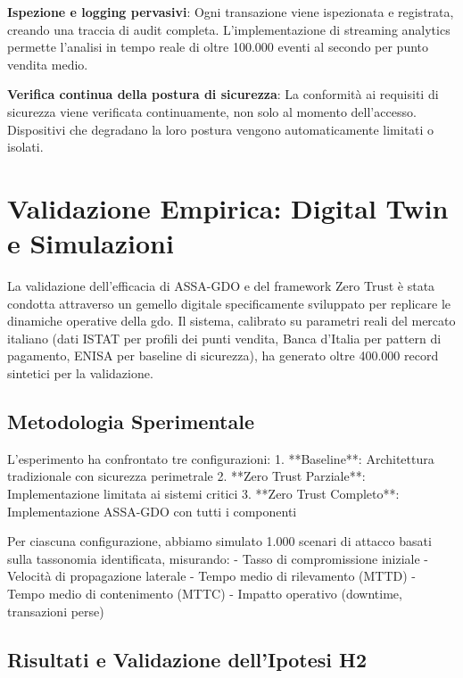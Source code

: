 \textbf{Ispezione e logging pervasivi}: Ogni transazione viene ispezionata e registrata, creando una traccia di audit completa. L'implementazione di streaming analytics permette l'analisi in tempo reale di oltre 100.000 eventi al secondo per punto vendita medio.

\textbf{Verifica continua della postura di sicurezza}: La conformità ai requisiti di sicurezza viene verificata continuamente, non solo al momento dell'accesso. Dispositivi che degradano la loro postura vengono automaticamente limitati o isolati.

\section{\texorpdfstring{Validazione Empirica: Digital Twin e Simulazioni}{2.6 - Validazione Empirica: Digital Twin e Simulazioni}}
\label{sec:validazione}

La validazione dell'efficacia di ASSA-GDO e del framework Zero Trust è stata condotta attraverso un gemello digitale specificamente sviluppato per replicare le dinamiche operative della \gls{gdo}. Il sistema, calibrato su parametri reali del mercato italiano (dati ISTAT per profili dei punti vendita, Banca d'Italia per pattern di pagamento, ENISA per baseline di sicurezza), ha generato oltre 400.000 record sintetici per la validazione.

\subsection{\texorpdfstring{Metodologia Sperimentale}{2.6.1 - Metodologia Sperimentale}}

L'esperimento ha confrontato tre configurazioni:
1. **Baseline**: Architettura tradizionale con sicurezza perimetrale
2. **Zero Trust Parziale**: Implementazione limitata ai sistemi critici
3. **Zero Trust Completo**: Implementazione ASSA-GDO con tutti i componenti

Per ciascuna configurazione, abbiamo simulato 1.000 scenari di attacco basati sulla tassonomia identificata, misurando:
- Tasso di compromissione iniziale
- Velocità di propagazione laterale
- Tempo medio di rilevamento (MTTD)
- Tempo medio di contenimento (MTTC)
- Impatto operativo (downtime, transazioni perse)

\subsection{\texorpdfstring{Risultati e Validazione dell'Ipotesi H2}{2.6.2 - Risultati e Validazione dell'Ipotesi H2}}

